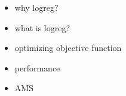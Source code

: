 \begin{itemize}
	\item why logreg?
	\item what is logreg?
	\item optimizing objective function
	\item performance
	\item AMS
\end{itemize}